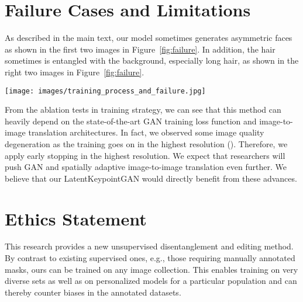 \documentclass[10pt, conference, compsocconf]{IEEEtran}
\begin{document}
 \section{Failure Cases and Limitations} 
As described in the main text, our model sometimes generates asymmetric faces as shown in the first two images in Figure~\ref{fig:failure}. In addition, the hair sometimes is entangled with the background, especially long hair, as shown in the right two images in Figure~\ref{fig:failure}. 

\begin{figure*}[h]
\begin{center}
   \texttt{[image: images/training\_process\_and\_failure.jpg]}
\end{center}
   \caption{(a) \textbf{Training process.} We visualize the image generated during the training. (b) \textbf{Failure cases.} The left top two images show asymmetric faces: different eye colors for the man and different blusher for the woman. The middle top two images show the entanglement of hair and background. The right top two images show that the pose of head is hidden in the relative positions of other keypoints than the keypoints on the head. We visualize the process of removing parts at the bottom. We sequentially remove the left eye, right eye, mouth, nose, and the entire face. Due to the entanglement of hair and background, the hair remains even if we remove the whole face.}
\label{fig:failure}
\end{figure*}

From the ablation tests in training strategy, we can see that this method can heavily depend on the state-of-the-art GAN training loss function and image-to-image translation architectures. In fact, we observed some image quality degeneration as the training goes on in the highest resolution (). Therefore, we apply early stopping in the highest resolution. We expect that researchers will push GAN and spatially adaptive image-to-image translation even further. We believe that our LatentKeypointGAN would directly benefit from these advances.
 \section{Ethics Statement}

This research provides a new unsupervised disentanglement and editing method. By contrast to existing supervised ones, e.g., those requiring manually annotated masks, ours can be trained on any image collection. This enables training on very diverse sets as well as on personalized models for a particular population and can thereby counter biases in the annotated datasets. 
\end{document}
